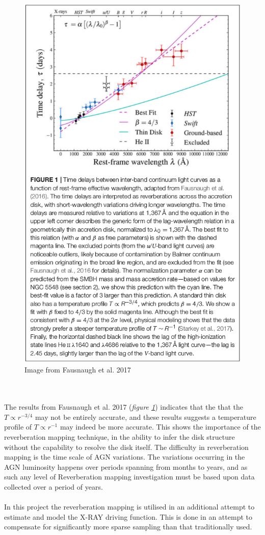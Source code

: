 \documentclass[a4paper, 12pt, twoside]{article}
\begin{document}
\begin{figure}[t!]
\centering
\includegraphics[width=0.5\linewidth]{Figure/Fausnaugh_AD_RM.png}
\caption{Image from Fausnaugh et al. 2017}
\label{fig:ad_rm_faugh}
\end{figure}
\\
\\
The results from Fausnaugh et al. 2017 (\emph{figure \ref{fig:ad_rm_faugh}}) indicates that the that the $T \propto r^{-3/4}$ may not be entirely accurate, and these results suggests a temperature profile of $T \propto r^{-1}$ may indeed be more accurate. This shows the importance of the reverberation mapping technique, in the ability to infer the disk structure without the capability to resolve the disk itself. The difficulty in reverberation mapping is the time scale of AGN variations. The variations occurring in the AGN luminosity happens over periods spanning from months to years, and as such any level of Reverberation mapping investigation must be based upon data collected over a period of years. \\
\\
In this project the reverberation mapping is utilised in an additional attempt to estimate and model the X-RAY driving function. This is done in an attempt to compensate for significantly more sparse sampling than that traditionally used. 
\end{document}
